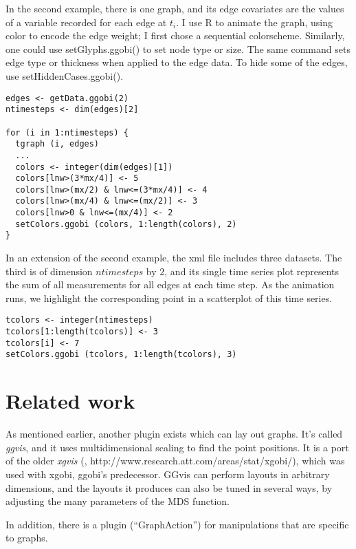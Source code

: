 \documentclass[11pt]{article}
\begin{document}
In the second example, there is one graph, and its edge covariates are
the values of a variable recorded for each edge at $t_i$.  I use R to
animate the graph, using color to encode the edge weight; I first chose
a sequential colorscheme.  Similarly, one could use setGlyphs.ggobi() to
set node type or size.  The same command sets edge type or thickness
when applied to the edge data.  To hide some of the edges, use
setHiddenCases.ggobi().

\begin{verbatim}
edges <- getData.ggobi(2)
ntimesteps <- dim(edges)[2]

for (i in 1:ntimesteps) {
  tgraph (i, edges)
  ...
  colors <- integer(dim(edges)[1])
  colors[lnw>(3*mx/4)] <- 5
  colors[lnw>(mx/2) & lnw<=(3*mx/4)] <- 4
  colors[lnw>(mx/4) & lnw<=(mx/2)] <- 3
  colors[lnw>0 & lnw<=(mx/4)] <- 2
  setColors.ggobi (colors, 1:length(colors), 2)
}
\end{verbatim}

In an extension of the second example, the xml file includes three
datasets.  The third is of dimension $ntimesteps$ by $2$, and its
single time series plot represents the sum of all measurements
for all edges at each time step.  As the animation runs,
we highlight the corresponding point in a scatterplot of this time series.

\begin{verbatim}
tcolors <- integer(ntimesteps)
tcolors[1:length(tcolors)] <- 3
tcolors[i] <- 7
setColors.ggobi (tcolors, 1:length(tcolors), 3)
\end{verbatim}

\section{Related work}

As mentioned earlier, another plugin exists which can lay out
graphs.  It's called {\em ggvis}, and it uses multidimensional
scaling to find the point positions.  It is a port of the older
{\em xgvis} (\cite{xgvis_jcgs2002}, http://www.research.att.com/areas/stat/xgobi/), which
was used with xgobi, ggobi's predecessor.  GGvis can perform layouts in
arbitrary dimensions, and the layouts it produces can also be tuned in
several ways, by adjusting the many parameters of the MDS function.

In addition, there is a plugin (``GraphAction'') for manipulations
that are specific to graphs.


\end{document}
